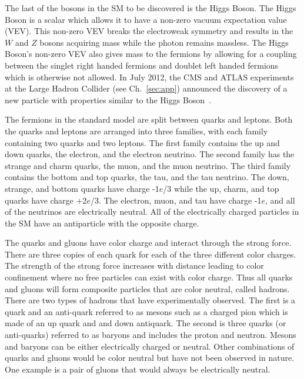 The last of the bosons in the SM to be discovered is the Higgs Boson. The Higgs Boson is a scalar which allows it to have a non-zero vacuum expectation value (VEV).
This non-zero VEV breaks the electroweak symmetry and results in the $W$ and $Z$ bosons acquiring mass while the photon remains massless.
The Higgs Boson's non-zero VEV also gives mass to the fermions by allowing for a coupling between the singlet right handed fermions and doublet left handed fermions
which is otherwise not allowed.
In July 2012, the CMS and ATLAS experiments at the Large Hadron Collider
(see Ch.~\ref{sec:app}) announced the discovery of a new particle with properties similar to the Higgs Boson~\cite{Chatrchyan:2012ufa, Aad:2012tfa}.

The fermions in the standard model are split between quarks and leptons. Both the quarks and leptons are arranged into three families,
with each family containing two quarks and two leptons. 
The first family contains the up and down quarks, the electron, and the electron neutrino.
The second family has the strange and charm quarks, the muon, and the muon neutrino. The third family contains the bottom and top quarks,
the tau, and the tau neutrino. The down, strange, and bottom quarks have charge -1$e$/3 while the up, charm, and top quarks have charge +2$e$/3.
The electron, muon, and tau have charge -1$e$, and all of the neutrinos are electrically neutral. All of the electrically charged particles in the SM have
an antiparticle with the opposite charge.


The quarks and gluons have color charge and interact through the strong force. There are three copies of each quark for each of the three different color charges.
The strength of the strong force increases with distance leading to color confinement where no free particles can exist with color charge.
Thus all quarks and gluons will form composite particles that are color neutral, called hadrons. There are two types of hadrons that have experimentally observed.
The first is a quark and an anti-quark referred to as mesons such as a charged pion which is made of an up quark and and down antiquark.
The second is three quarks (or anti-quarks) referred to as baryons and includes the proton and neutron.
Mesons and baryons can be either electrically charged or neutral.
Other combinations of quarks and gluons would be color neutral but have not been observed in nature.
One example is a pair of gluons that would always be electrically neutral.

